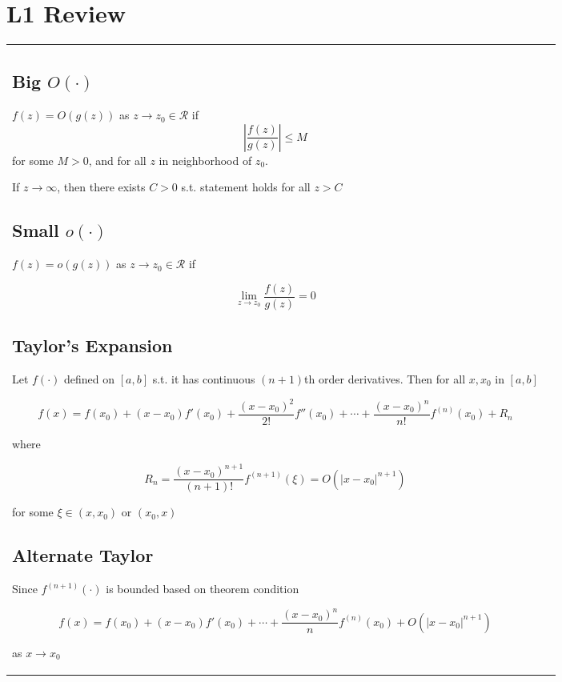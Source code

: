 \section{L1 Review}

\begin{tabulary}{\textwidth}{l L}

\subsection{Big $O(\cdot)$}

$f(z) = O(g(z))$ as $z\rightarrow z_0 \in \mathcal{R}$ if 
$$
\left|\frac{f(z)}{g(z)}\right| \leq M
$$
for some $M > 0$, and for all $z$ in neighborhood of $z_0$.

If $z\rightarrow \infty$, then there exists $C>0$ s.t. statement holds for all $z>C$

\subsection{Small $o(\cdot)$}

$f(z)=o(g(z))$ as $z\rightarrow z_0 \in \mathcal{R}$ if

$$
\lim_{z\rightarrow z_0} \frac{f(z)}{g(z)} = 0
$$

\subsection{Taylor's Expansion}

Let $f(\cdot)$ defined on $[a, b]$ s.t. it has continuous $(n+1)$th order derivatives. Then for all $x, x_0$ in $[a, b]$

$$
f(x) = f(x_0) + (x-x_0) f'(x_0) + \frac{(x-x_0)^2}{2!} f''(x_0) + \cdots + \frac{(x-x_0)^n}{n!} f^{(n)}(x_0) + R_n
$$

where

$$
R_n = \frac{(x-x_0)^{n+1}}{(n+1)!} f^{(n+1)}(\xi) = O(|x-x_0|^{n+1})
$$

for some $\xi\in(x, x_0)$ or $(x_0, x)$

\subsection{Alternate Taylor}

Since $f^{(n+1)}(\cdot)$ is bounded based on theorem condition

$$
f(x) = f(x_0) + (x-x_0)f'(x_0) + \cdots + \frac{(x-x_0)^n}{n} f^{(n)}(x_0) + O(|x-x_0|^{n+1})
$$

as $x\rightarrow x_0$


\end{tabulary}
